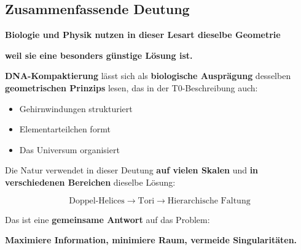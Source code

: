 	\subsection{Zusammenfassende Deutung}

	\begin{revolutionary}[Deutung \textbf{[S]}]

		\begin{center}
			\textbf{Biologie und Physik nutzen in dieser Lesart dieselbe Geometrie}

			\vspace{0.3cm}

			\textbf{weil sie eine besonders günstige Lösung ist.}
		\end{center}

		\normalsize

		\vspace{0.3cm}

		\textbf{DNA-Kompaktierung} lässt sich als \textbf{biologische Ausprägung} desselben \textbf{geometrischen Prinzips} lesen, das in der T0-Beschreibung auch:

		\begin{itemize}
			\item Gehirnwindungen strukturiert
			\item Elementarteilchen formt
			\item Das Universum organisiert
		\end{itemize}

		\vspace{0.3cm}

		Die Natur verwendet in dieser Deutung \textbf{auf vielen Skalen} und \textbf{in verschiedenen Bereichen} dieselbe Lösung:

		\begin{equation}
			\boxed{\text{Doppel-Helices} \to \text{Tori} \to \text{Hierarchische Faltung}}
		\end{equation}

		\vspace{0.3cm}

		Das ist eine \textbf{gemeinsame Antwort} auf das Problem: 

		\textbf{Maximiere Information, minimiere Raum, vermeide Singularitäten.}
	\end{revolutionary}
